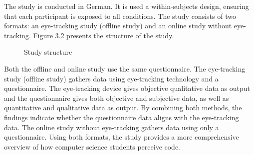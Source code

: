 The study is conducted in German. It is used a within-subjects design, ensuring that each participant is exposed to all conditions.
The study consists of two formats: an eye-tracking study (offline study) and an online study without eye-tracking. Figure 3.2 presents the structure of the study. 
\begin{figure}[H]
  \centering
  \caption{Study structure}
  \label{fig:AnhangsChor}

\end{figure}


Both the offline and online study use the same questionnaire. The eye-tracking study (offline study) gathers data using eye-tracking technology and a questionnaire. The eye-tracking device gives objective qualitative data as output and the questionnaire gives both objective and subjective data, as well as quantitative and qualitative data as output.  By combining both methods, the findings indicate whether the questionnaire data aligns with the eye-tracking data.
The online study without eye-tracking gathers data using only a questionnaire.  Using both formats, the study provides a more comprehensive overview of how computer science students perceive code. 



